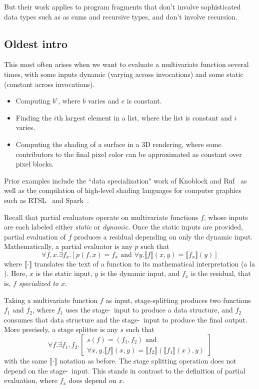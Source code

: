 But their work applies to program fragments that don't involve sophisticated
data types such as as sums and recursive types, and don't involve recursion.

\subsection{Oldest intro}

This most often arises when
we want to evaluate a multivariate function several times, with some inputs
dynamic (varying across invocations) and some static (constant across
invocations).
\begin{itemize}
\item Computing $b^e$, where $b$ varies and $e$ is constant.
\item Finding the $i$th largest element in a list, where the list is constant
and $i$ varies.
\item Computing the shading of a surface in a 3D rendering, where some
contributors to the final pixel color can be approximated as constant over
pixel blocks.  
\end{itemize}
Prior examples
include the ``data specialization" work of Knoblock and Ruf~\cite{knoblock96}
as well as the compilation of high-level shading languages for computer graphics
such as RTSL~\cite{Proudfoot:2001} and Spark~\cite{Foley:2011}.

Recall that partial evaluators operate on multivariate functions $f$, whose
inputs are each labeled either {\em static} or {\em dynamic}. Once the static
inputs are provided, partial evaluation of $f$ produces a residual depending on
only the dynamic input. Mathematically, a partial evaluator is any $p$ such that
\[
	\forall f,x. \exists f_x. \left[p(f,x) = f_x \text{ and } \forall y.\llbracket f \rrbracket(x,y)=\llbracket f_x \rrbracket(y)\right]
\]
where $\llbracket \cdot \rrbracket$ translates the text of a function to its
mathematical interpretation (a la \cite{jones96}). Here, $x$ is the static
input, $y$ is the dynamic input, and $f_x$ is the residual, that is, \emph{$f$
specialized to $x$}.

Taking a multivariate function $f$ as input, stage-splitting produces two
functions $f_1$ and $f_2$, where $f_1$ uses the stage-\bbone\ input to produce a
data structure, and $f_2$ consumes that data structure and the stage-\bbtwo\
input to produce the final output.  More precisely, a stage splitter is any $s$
such that
\[
	\forall f. \exists f_1,f_2. 
	\left[
		\begin{array}{l}
		s(f) = (f_1,f_2) \text{ and } \\
		\forall x,y.\llbracket f \rrbracket(x,y)=\llbracket f_2 \rrbracket(\llbracket f_1 \rrbracket(x),y)
		\end{array}
	\right]
\]
with the same $\llbracket \cdot \rrbracket$ notation as before.
The stage splitting operation does not depend on the stage-\bbone\ input.
This stands in contrast to the definition of partial evaluation, where $f_x$ does depend on $x$.

